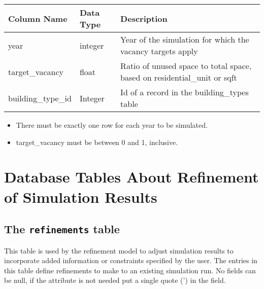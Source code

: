\begin{tabular}{lll}

\textbf{Column Name} & \textbf{Data Type} & \textbf{Description} \\

\hline year & integer & Year of the simulation for which the vacancy
targets
apply  \\

\hline target_vacancy & float & Ratio of unused 
space to total space, based on residential\_unit or sqft   \\

\hline building_type_id & Integer & Id of a record in the building_types table  \\

\hline
\end{tabular}

\begin{itemize}
\tight
\item There must be exactly one row for each year to be simulated.
\item target_vacancy must be between 0 and 1, inclusive.
\end{itemize}


\section{Database Tables About Refinement of Simulation Results}
\subsection{The {\tt refinements} table}
\label{sec:db-tables-refinements}

This table is used by the refinement model to adjust simulation results to incorporate added information or constraints specified by the user. The entries in this table define refinements to make to an existing simulation run. No fields can be null, if the attribute is not needed put a single quote (') in the field.

